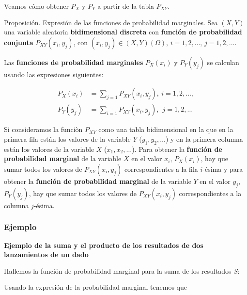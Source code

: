 \documentclass[]{book}
\begin{document}
Veamos cómo obtener \(P_X\) y \(P_Y\) a partir de la tabla \(P_{XY}\).

Proposición. Expresión de las funciones de probabilidad marginales.
Sea \((X,Y)\) una variable aleatoria \textbf{bidimensional discreta} con \textbf{función de probabilidad conjunta} \(P_{XY}(x_i,y_j)\), con \((x_i,y_j)\in (X,Y)(\Omega)\), \(i=1,2,\ldots\), \(j=1,2,\ldots\).

Las \textbf{funciones de probabilidad marginales} \(P_X(x_i)\) y \(P_Y(y_j)\) se calculan usando las expresiones siguientes:

\[
\begin{array}{rl}
P_X(x_i)  & = \sum_{j=1} P_{XY}(x_i,y_j),\  i=1,2,\ldots,\\ P_Y(y_j) &  = \sum_{i=1} P_{XY}(x_i,y_j),\ \ j=1,2,\ldots
\end{array}
\]

Si consideramos la funciòn \(P_{XY}\) como una tabla bidimensional en la que en la primera fila están los valores de la variable \(Y\) (\(y_1,y_2,\ldots\)) y en la primera columna están los valores de la variable \(X\) (\(x_1,x_2,\ldots\)). Para obtener la \textbf{función de probabilidad marginal} de la variable \(X\) en el valor \(x_i\), \(P_X(x_i)\), hay que sumar todos los valores de \(P_{XY}(x_i,y_j)\) correspondientes a la fila \(i\)-ésima y para obtener la \textbf{función de probabilidad marginal} de la variable \(Y\) en el valor \(y_j\), \(P_Y(y_j)\), hay que sumar todos los valores de \(P_{XY}(x_i,y_j)\) correspondientes a la columna \(j\)-ésima.

\hypertarget{ejemplo}{%
\subsubsection{Ejemplo}\label{ejemplo}}

\textbf{Ejemplo de la suma y el producto de los resultados de dos lanzamientos de un dado}

Hallemos la función de probabilidad marginal para la suma de los resultados \(S\):

Usando la expresión de la probabilidad marginal tenemos que
\end{document}
